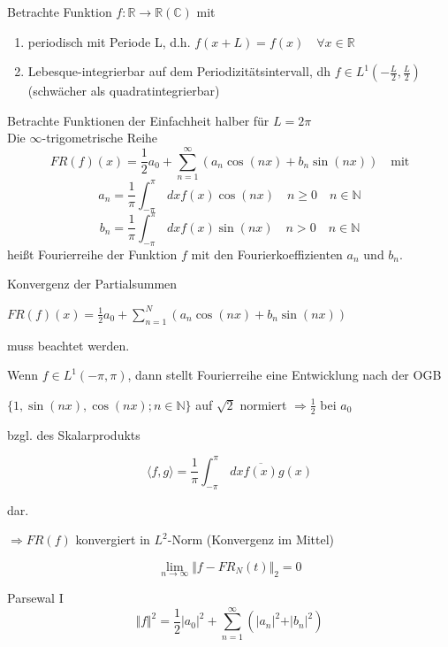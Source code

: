 	Betrachte Funktion $f: \mathbb{R}\rightarrow\mathbb{R}(\mathbb{C})$ mit
	\begin{enumerate}[label=(\roman*)]
		\item periodisch mit Periode L, d.h. $f(x+L) = f(x) \quad \forall x \in \mathbb{R}$
		\item Lebesque-integrierbar auf dem Periodizitätsintervall, dh $f \in L^1(-\frac{L}{2},\frac{L}{2})$ (schwächer als quadratintegrierbar)
	\end{enumerate}

	Betrachte Funktionen der Einfachheit halber für $L=2\pi$\\
	Die $\infty$-trigometrische Reihe
	$$FR(f)(x)= \frac{1}{2} a_0 + \sum_{n=1}^\infty (a_n \cos(n x) + b_n \sin(n x)) \quad \textrm{mit}$$
	$$a_n = \frac{1}{\pi} \int_{-\pi}^{\pi} \,dx f(x)\cos(nx) \quad n \geq 0 \quad n \in \mathbb{N}$$
	$$b_n = \frac{1}{\pi} \int_{-\pi}^{\pi} \,dx f(x)\sin(nx) \quad n>0 \quad n \in \mathbb{N}$$
	heißt Fourierreihe der Funktion $f$ mit den Fourierkoeffizienten $a_n$ und $b_n$.

	Konvergenz der Partialsummen

	$FR(f)(x)= \frac{1}{2} a_0 + \sum_{n=1}^N (a_n \cos(n x) + b_n \sin(n x))$

	muss beachtet werden.

	\begin{Bem}
		Wenn $f \in L^1(-\pi,\pi)$, dann stellt Fourierreihe eine Entwicklung nach der
		OGB

		$\{1, \sin(nx), \cos(nx); n \in \mathbb{N}\}$ auf $\sqrt{2}$ normiert $\Rightarrow \frac{1}{2}$ bei $a_0$

		bzgl. des Skalarprodukts

		$$\langle f,g \rangle =  \frac{1}{\pi} \int_{-\pi}^{\pi} \,dx \overline{f(x)} g(x)$$

		dar.

		$\Rightarrow FR(f)$ konvergiert in $L^2$-Norm (Konvergenz im Mittel)

		$$\lim_{n\rightarrow \infty} {\Vert f- FR_N(t) \Vert}_2 = 0$$
	\end{Bem}

	\begin{Satz}{Parsewal I}
		$$\Vert f \Vert^2 = \frac{1}{2} \vert a_0 \vert^2 + \sum_{n=1}^{\infty} \left(\vert a_n \vert^2 + \vert b_n \vert^2\right)$$
	\end{Satz}


